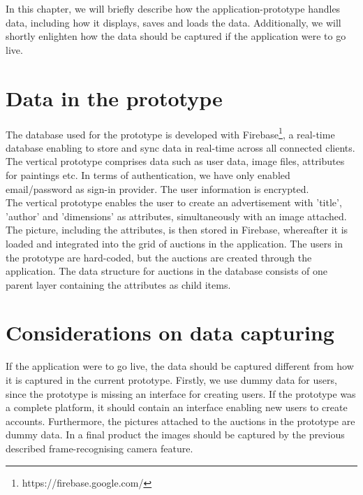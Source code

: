 In this chapter, we will briefly describe how the application-prototype handles data, including how it displays, saves and loads the data. Additionally, we will shortly enlighten how the data should be captured if the application were to go live. 

\section{Data in the prototype}
The database used for the prototype is developed with Firebase\footnote{https://firebase.google.com/}, a real-time database enabling to store and sync data in real-time across all connected clients. The vertical prototype comprises data such as user data, image files, attributes for paintings etc. In terms of authentication, we have only enabled email/password as sign-in provider. The user information is encrypted. \\

The vertical prototype enables the user to create an advertisement with 'title', 'author' and 'dimensions' as attributes, simultaneously with an image attached. The picture, including the attributes, is then stored in Firebase, whereafter it is loaded and integrated into the grid of auctions in the application. The users in the prototype are hard-coded, but the auctions are created through the application. The data structure for auctions in the database consists of one parent layer containing the attributes as child items. 

\section{Considerations on data capturing}
If the application were to go live, the data should be captured different from how it is captured in the current prototype. Firstly, we use dummy data for users, since the prototype is missing an interface for creating users. If the prototype was a complete platform, it should contain an interface enabling new users to create accounts. Furthermore, the pictures attached to the auctions in the prototype are dummy data. In a final product the images should be captured by the previous described frame-recognising camera feature.